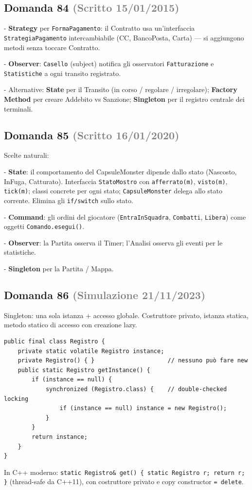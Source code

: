 \documentclass[a4paper,11pt]{article}
\begin{document}
\subsection*{Domanda 84 \hfill {\small \textcolor{gray}{(Scritto 15/01/2015)}}}
- \textbf{Strategy} per \texttt{FormaPagamento}: il Contratto usa un'interfaccia \texttt{StrategiaPagamento} intercambiabile (CC, BancoPosta, Carta) — si aggiungono metodi senza toccare Contratto.

- \textbf{Observer}: \texttt{Casello} (subject) notifica gli osservatori \texttt{Fatturazione} e \texttt{Statistiche} a ogni transito registrato.

- Alternative: \textbf{State} per il Transito (in corso / regolare / irregolare); \textbf{Factory Method} per creare Addebito vs Sanzione; \textbf{Singleton} per il registro centrale dei terminali.



\subsection*{Domanda 85 \hfill {\small \textcolor{gray}{(Scritto 16/01/2020)}}}
Scelte naturali:

- \textbf{State}: il comportamento del CapsuleMonster dipende dallo stato (Nascosto, InFuga, Catturato). Interfaccia \texttt{StatoMostro} con \texttt{afferrato(m)}, \texttt{visto(m)}, \texttt{tick(m)}; classi concrete per ogni stato; \texttt{CapsuleMonster} delega allo stato corrente. Elimina gli \texttt{if/switch} sullo stato.

- \textbf{Command}: gli ordini del giocatore (\texttt{EntraInSquadra}, \texttt{Combatti}, \texttt{Libera}) come oggetti \texttt{Comando.esegui()}.

- \textbf{Observer}: la Partita osserva il Timer; l'Analisi osserva gli eventi per le statistiche.

- \textbf{Singleton} per la Partita / Mappa.



\subsection*{Domanda 86 \hfill {\small \textcolor{gray}{(Simulazione 21/11/2023)}}}
Singleton: una sola istanza + accesso globale. Costruttore privato, istanza statica, metodo statico di accesso con creazione lazy.

\begin{verbatim}
public final class Registro {
    private static volatile Registro instance;
    private Registro() { }                     // nessuno può fare new
    public static Registro getInstance() {
        if (instance == null) {
            synchronized (Registro.class) {    // double-checked locking
                if (instance == null) instance = new Registro();
            }
        }
        return instance;
    }
}
\end{verbatim}
In C++ moderno: \texttt{static Registro\& get() \{ static Registro r; return r; \}} (thread-safe da C++11), con costruttore privato e copy constructor \texttt{= delete}.
\end{document}

